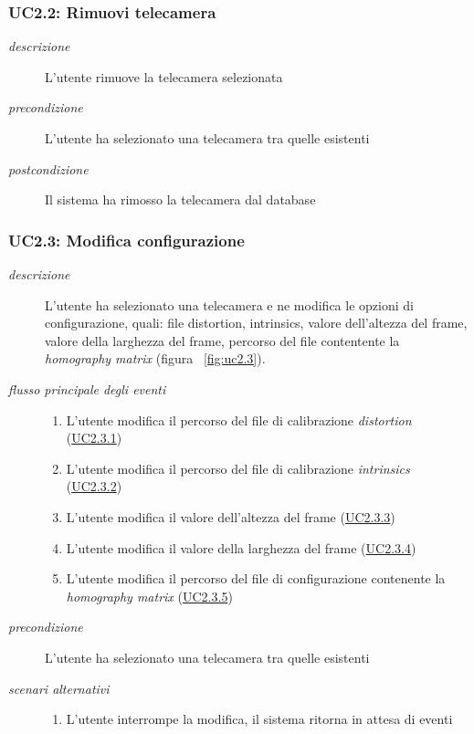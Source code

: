 \subsubsection{UC2.2: Rimuovi telecamera} \label{sec:UC2.2}
\begin{description}
\item[\em{descrizione }]L'utente rimuove la telecamera selezionata
\item[\em{precondizione }] L'utente ha selezionato una telecamera tra quelle esistenti
\item[\em{postcondizione }] Il sistema ha rimosso la telecamera dal database
\end{description}

\subsubsection{UC2.3: Modifica configurazione} \label{sec:UC2.3}
\begin{description}
\item[\em{descrizione }]L'utente ha selezionato una telecamera e ne modifica le opzioni di configurazione, quali: file distortion, intrinsics, valore dell'altezza del frame, valore della larghezza del frame, percorso del file contentente la \textit{homography matrix} (figura ~\ref{fig:uc2.3}).
\item[\em{flusso principale degli eventi }] \mbox{}
 \begin{enumerate}
\item L'utente modifica il percorso del file di calibrazione \textit{distortion} (\hyperref[sec:uc2.3.1]{UC2.3.1})
\item L'utente modifica il percorso del file di calibrazione \textit{intrinsics} (\hyperref[sec:uc2.3.2]{UC2.3.2})
\item L'utente modifica il valore dell'altezza del frame (\hyperref[sec:uc2.3.3]{UC2.3.3})
\item L'utente modifica il valore della larghezza del frame (\hyperref[sec:uc2.3.4]{UC2.3.4})
\item L'utente modifica il percorso del file di configurazione contenente la \textit{homography matrix} (\hyperref[sec:uc2.3.5]{UC2.3.5})
\end{enumerate}
\item[\em{precondizione }] L'utente ha selezionato una telecamera tra quelle esistenti
\item[\em{scenari alternativi }] \mbox{}

  \begin{enumerate}
\item L'utente interrompe la modifica, il sistema ritorna in attesa di eventi
\end{enumerate}
\end{description}

